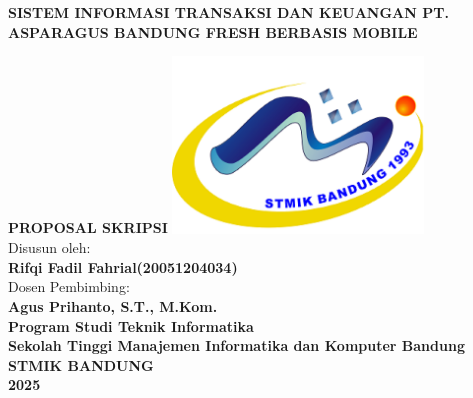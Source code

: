 \begin{titlepage}
	\begin{center}
		{\large \textbf{SISTEM INFORMASI TRANSAKSI DAN KEUANGAN PT. ASPARAGUS BANDUNG FRESH BERBASIS MOBILE\\}}
		\vspace{0.5cm}

		\textbf{PROPOSAL SKRIPSI}
		\vfill
		\includegraphics[width=0.5\textwidth]{images/logo.png}\\
		\vspace*{1cm}
		Disusun oleh:\\
		\textbf{Rifqi Fadil Fahrial(20051204034)}\\
		Dosen Pembimbing:\\
		\textbf{Agus Prihanto, S.T., M.Kom.}\\
		\vfill
		{\large \textbf{Program Studi Teknik Informatika\\ Sekolah Tinggi Manajemen Informatika dan Komputer Bandung \\ STMIK BANDUNG \\ 2025}}
	\end{center}
\end{titlepage}

